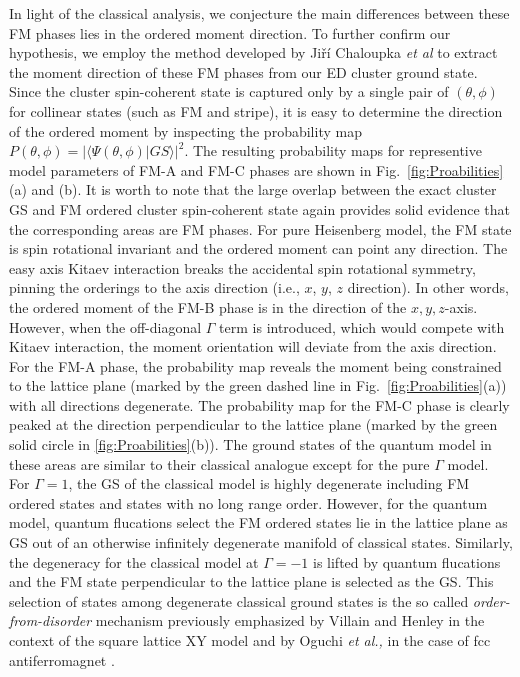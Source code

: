 \documentclass[aps,prb,reprint,amsfonts,amsmath,amssymb,showpacs,groupedaddress,superscriptaddress]{revtex4-1}
\begin{document}
In light of the classical analysis, we conjecture the main differences between these FM phases lies in the ordered moment direction. To further confirm our hypothesis, we employ the method developed by Ji\v{r}\'{i} Chaloupka \emph{et  al} \cite{PhysRevB.94.064435} to extract the moment direction of these FM phases from our ED cluster ground state. Since the cluster spin-coherent state is captured only by a single pair of $(\theta, \phi)$ for collinear states (such as FM and stripe), it is easy to determine the direction of the ordered moment by inspecting the probability map $P(\theta, \phi) = | \langle \Psi (\theta, \phi) | GS \rangle |^2$. The resulting probability maps for representive model parameters of FM-A and FM-C phases are shown in Fig.~\ref{fig:Proabilities}(a) and (b). It is worth to note that the large overlap between the exact cluster GS and FM ordered cluster spin-coherent state again provides solid evidence that the corresponding areas are FM phases. For pure Heisenberg model, the FM state is spin rotational invariant and the ordered moment can point any direction. The easy axis Kitaev interaction breaks the accidental spin rotational symmetry, pinning the orderings to the axis direction (i.e., $x$, $y$, $z$ direction). In other words, the ordered moment of the FM-B phase is in the direction of the $x,y,z$-axis. However, when the off-diagonal $\Gamma$ term is introduced, which would compete with Kitaev interaction, the moment orientation will deviate from the axis direction. For the FM-A phase, the probability map reveals the moment being constrained to the lattice plane (marked by the green dashed line in Fig.~\ref{fig:Proabilities}(a)) with all directions degenerate. The probability map for the FM-C phase is clearly peaked at the direction perpendicular to the lattice plane (marked by the green solid circle in \ref{fig:Proabilities}(b)). The ground states of the quantum model in these areas are similar to their classical analogue except for the pure $\Gamma$ model. For $\Gamma=1$, the GS of the classical model is highly degenerate including FM ordered states and states with no long range order. However, for the quantum model, quantum flucations select the FM ordered states lie in the lattice plane as GS out of an otherwise infinitely degenerate manifold of classical states. Similarly, the degeneracy for the classical model at $\Gamma=-1$ is lifted by quantum flucations and the FM state perpendicular to the lattice plane is selected as the GS. This selection of states among degenerate classical ground states is the so called \emph{order-from-disorder} mechanism previously emphasized by Villain and Henley in the context of the square lattice XY model \cite{PhysRevLett.62.2056} and by Oguchi \emph{et al.,} in the case of fcc antiferromagnet \cite{JPSJ.54.4494}.
\end{document}
